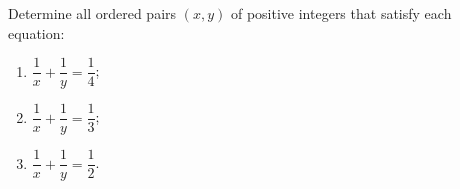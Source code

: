 Determine all ordered pairs $(x,y)$ of positive integers that satisfy each equation:
\begin{enumerate}
\item[(a)] $\dfrac{1}{x}+\dfrac{1}{y}=\dfrac{1}{4}$;
\item[(b)] $\dfrac{1}{x}+\dfrac{1}{y}=\dfrac{1}{3}$;
\item[(c)] $\dfrac{1}{x}+\dfrac{1}{y}=\dfrac{1}{2}$.
\end{enumerate}
